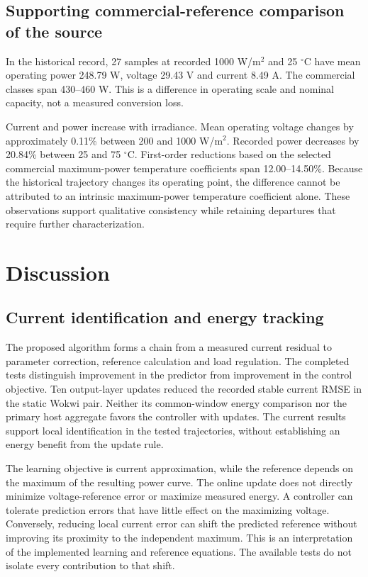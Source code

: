 \documentclass[Acad.Energy.,researcharticle,9pt,twoside,oneauthor]{Definitions/jams_academia}
\begin{document}
\subsection{Supporting commercial-reference comparison of the source}
In the historical record, 27 samples at recorded 1000 W/m$^2$ and 25 $^\circ$C have mean operating power 248.79 W, voltage 29.43 V and current 8.49 A. The commercial classes span 430--460 W. This is a difference in operating scale and nominal capacity, not a measured conversion loss.

Current and power increase with irradiance. Mean operating voltage changes by approximately 0.11\% between 200 and 1000 W/m$^2$. Recorded power decreases by 20.84\% between 25 and 75 $^\circ$C. First-order reductions based on the selected commercial maximum-power temperature coefficients span 12.00--14.50\%. Because the historical trajectory changes its operating point, the difference cannot be attributed to an intrinsic maximum-power temperature coefficient alone. These observations support qualitative consistency while retaining departures that require further characterization.

\section{Discussion}
\subsection{Current identification and energy tracking}
The proposed algorithm forms a chain from a measured current residual to parameter correction, reference calculation and load regulation. The completed tests distinguish improvement in the predictor from improvement in the control objective. Ten output-layer updates reduced the recorded stable current RMSE in the static Wokwi pair. Neither its common-window energy comparison nor the primary host aggregate favors the controller with updates. The current results support local identification in the tested trajectories, without establishing an energy benefit from the update rule.

The learning objective is current approximation, while the reference depends on the maximum of the resulting power curve. The online update does not directly minimize voltage-reference error or maximize measured energy. A controller can tolerate prediction errors that have little effect on the maximizing voltage. Conversely, reducing local current error can shift the predicted reference without improving its proximity to the independent maximum. This is an interpretation of the implemented learning and reference equations. The available tests do not isolate every contribution to that shift.
\end{document}
